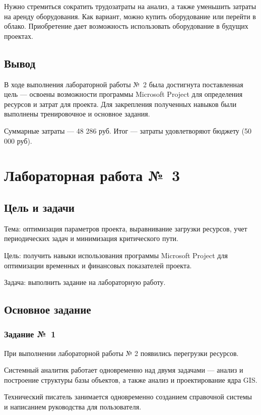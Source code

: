 \documentclass{bmstu}
\begin{document}
Нужно стремиться сократить трудозатраты на анализ, а также уменьшить затраты на аренду оборудования. 
Как вариант, можно купить оборудование или перейти в облако. 
Приобретение дает возможность использовать оборудование в будущих проектах.

\section{Вывод}

В ходе выполнения лабораторной работы №~2 была достигнута поставленная цель --- освоены возможности программы Microsoft Project для определения ресурсов и затрат для проекта. 
Для закрепления полученных навыков были выполнены тренировочное и основное задания.

Суммарные затраты --- 48 286 руб. 
Итог --- затраты удовлетворяют бюджету (50 000 руб).

\chapter{Лабораторная работа №~3}

\section{Цель и задачи}

Тема: оптимизация параметров проекта, выравнивание загрузки ресурсов, учет периодических задач и минимизация критического пути.

Цель: получить навыки использования программы Microsoft Project для оптимизации временных и финансовых показателей проекта.

Задача: выполнить задание на лабораторную работу.

\section{Основное задание}

\subsection{Задание №~1}

При выполнении лабораторной работы № 2 появились перегрузки ресурсов.

Системный аналитик работает одновременно над двумя задачами --- анализ и построение структуры базы объектов, а также анализ и проектирование ядра GIS.

Технический писатель занимается одновременно созданием справочной системы и написанием руководства для пользователя.
\end{document}
